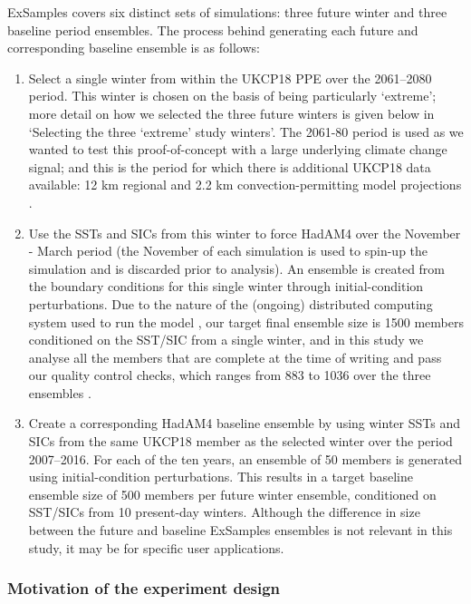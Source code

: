     ExSamples covers six distinct sets of simulations: three future winter and three baseline period ensembles. The process behind generating each future and corresponding baseline ensemble is as follows:

    \begin{enumerate}
      \item Select a single winter from within the UKCP18 PPE over the 2061--2080 period. This winter is chosen on the basis of being particularly `extreme'; more detail on how we selected the three future winters is given below in `Selecting the three `extreme' study winters'. The 2061-80 period is used as we wanted to test this proof-of-concept with a large underlying climate change signal; and this is the period for which there is additional UKCP18 data available: 12 km regional and 2.2 km convection-permitting model projections \citep{kendon_ukcp_2019,murphy_ukcp18_2018}.
      \item Use the SSTs and SICs from this winter to force HadAM4 over the November - March period (the November of each simulation is used to spin-up the simulation and is discarded prior to analysis). An ensemble is created from the boundary conditions for this single winter through initial-condition perturbations. Due to the nature of the (ongoing) distributed computing system used to run the model \citep{allen_-it-yourself_1999,stainforth_uncertainty_2005}, our target final ensemble size is 1500 members conditioned on the SST/SIC from a single winter, and in this study we analyse all the members that are complete at the time of writing and pass our quality control checks, which ranges from 883 to 1036 over the three ensembles \citep{sparrow_exsamples_2021}.
      \item Create a corresponding HadAM4 baseline ensemble by using winter SSTs and SICs from the same UKCP18 member as the selected winter over the period 2007--2016. For each of the ten years, an ensemble of 50 members is generated using initial-condition perturbations. This results in a target baseline ensemble size of 500 members per future winter ensemble, conditioned on SST/SICs from 10 present-day winters. Although the difference in size between the future and baseline ExSamples ensembles is not relevant in this study, it may be for specific user applications.
    \end{enumerate}
  
    \subsubsection{Motivation of the experiment design}

